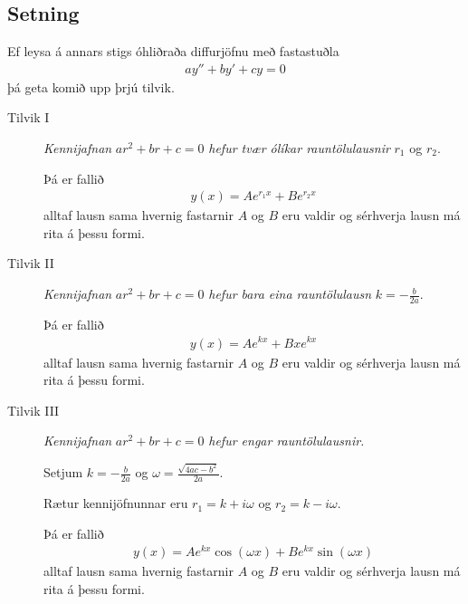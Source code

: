\documentclass[b5paper,11pt,icelandic]{sphinxmanual}
\begin{document}
\subsection{Setning}
\label{kafli08:id3}\label{kafli08:stigs-ohlidrud}
Ef leysa á annars stigs óhliðraða diffurjöfnu með fastastuðla
\begin{equation*}
\begin{split}ay''+by'+cy=0\end{split}
\end{equation*}
þá geta komið upp þrjú tilvik.
\begin{description}
\item[{Tilvik I}] \leavevmode
\emph{Kennijafnan} \(ar^2+br+c=0\) \emph{hefur tvær ólíkar rauntölulausnir}
\(r_1\) og \(r_2\).

Þá er fallið
\begin{equation*}
\begin{split}y(x)=Ae^{r_1x}+Be^{r_2x}\end{split}
\end{equation*}
alltaf lausn sama hvernig fastarnir \(A\) og \(B\) eru
valdir og sérhverja lausn má rita á þessu formi.

\item[{Tilvik II}] \leavevmode
\emph{Kennijafnan} \(ar^2+br+c=0\) \emph{hefur bara eina rauntölulausn}
\(k=-\frac{b}{2a}\).

Þá er fallið
\begin{equation*}
\begin{split}y(x)=Ae^{kx}+Bxe^{kx}\end{split}
\end{equation*}
alltaf lausn sama hvernig fastarnir \(A\) og \(B\) eru
valdir og sérhverja lausn má rita á þessu formi.

\item[{Tilvik III}] \leavevmode
\emph{Kennijafnan} \(ar^2+br+c=0\) \emph{hefur engar rauntölulausnir.}

Setjum \(k=-\frac{b}{2a}\) og
\(\omega=\frac{\sqrt{4ac-b^2}}{2a}\).

Rætur kennijöfnunnar eru \(r_1=k+i\omega\) og
\(r_2=k-i\omega\).

Þá er fallið
\begin{equation*}
\begin{split}y(x)=Ae^{kx}\cos(\omega x)+Be^{kx}\sin(\omega x)\end{split}
\end{equation*}
alltaf lausn sama hvernig fastarnir \(A\) og \(B\) eru
valdir og sérhverja lausn má rita á þessu formi.

\end{description}
\end{document}
